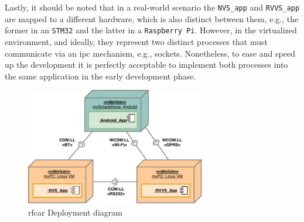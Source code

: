 Lastly, it should be noted that in a real-world scenario the \texttt{NVS\_app}
and \texttt{RVVS\_app} are mapped to a different hardware, which is also distinct
between them, e.g., the former in an \texttt{STM32} and the latter in a
\texttt{Raspberry Pi}. However, in the virtualized environment, and ideally,
they represent two distinct processes that must communicate via an \gls{ipc}
mechanism, e.g., sockets. Nonetheless, to ease and speed up the development it
is perfectly acceptable to implement both processes into the same application in
the early development phase.
\begin{figure}[!hbt]
\centering
    \includegraphics[width=0.7\textwidth]{./img/deployment-diag.pdf}
  \caption{\acrshort{rfcar} Deployment diagram}%
\label{fig:deployment-diag}
\end{figure}
%
